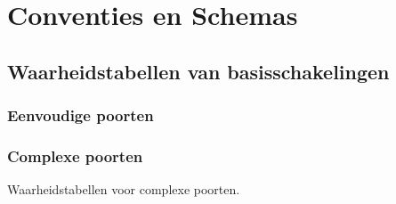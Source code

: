 \chapter{Conventies en Schemas}

\section{Waarheidstabellen van basisschakelingen}
\subsection{Eenvoudige poorten}
\subsection{Complexe poorten}

\begin{table}
\centering
{}
\caption{Waarheidstabellen voor complexe poorten.}
\end{table}

